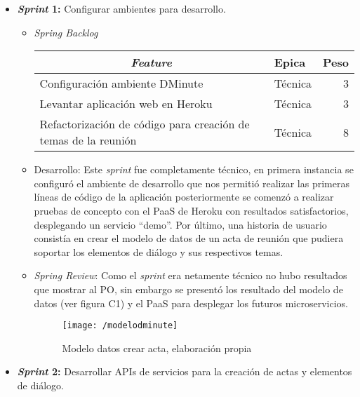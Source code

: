 \begin{itemize}
	\item \textbf{\textit{Sprint} 1:} Configurar ambientes para desarrollo.

\begin{itemize}
\item \textit{Spring Backlog}

\begin{table}[!h]
\centering
\label{tab:backlog1}
\begin{tabular}{|l|l|r|}
\hline
\multicolumn{1}{|c|}{\textit{\textbf{Feature}}} & \textbf{Epica} & \textbf{Peso} \\ \hline
Configuración ambiente DMinute & Técnica & 3 \\ \hline
Levantar aplicación web en Heroku & Técnica & 3 \\ \hline
Refactorización de código para creación de temas de la reunión & Técnica & 8 \\ \hline
\end{tabular}
\end{table}

\item Desarrollo: Este \textit{sprint} fue completamente técnico, en primera instancia se configuró el ambiente de desarrollo que nos permitió realizar las primeras líneas de código de la aplicación posteriormente se comenzó a realizar pruebas de concepto con el PaaS de Heroku con resultados satisfactorios, desplegando un servicio “demo”. Por último, una historia de usuario consistía en crear el modelo de datos de un acta de reunión que pudiera soportar los elementos de diálogo y sus respectivos temas.

\item \textit{Spring Review}: Como el \textit{sprint} era netamente técnico no hubo resultados que mostrar al PO, sin embargo se presentó los resultado del modelo de datos (ver figura C1) y el PaaS para desplegar los futuros microservicios.

\begin{figure}[!h]
\centering
\texttt{[image: /modelodminute]}
\label{imga-c1}
\caption{Modelo datos crear acta, elaboración propia}
\end{figure}

\end{itemize}


	\item \textbf{\textit{Sprint} 2:} Desarrollar APIs de servicios para la creación de actas y elementos de diálogo.


\end{itemize}
